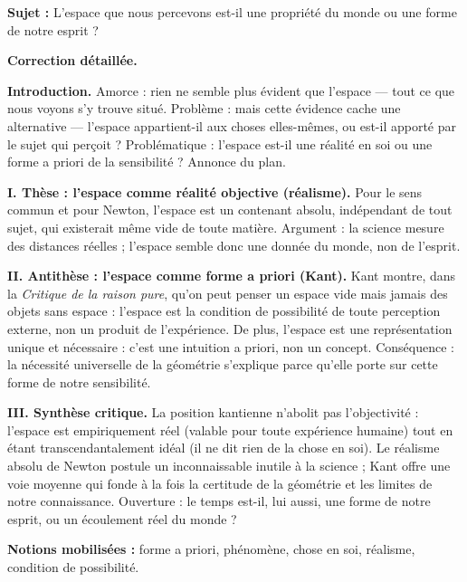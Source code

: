 \documentclass[11pt]{article}
\begin{document}
\begin{exoresolu}
\textbf{Sujet :} L'espace que nous percevons est-il une propriété du monde ou une forme de notre esprit ?

\tcblower
\textbf{Correction détaillée.}

\textbf{Introduction.} Amorce : rien ne semble plus évident que l'espace — tout ce que nous voyons s'y trouve situé. Problème : mais cette évidence cache une alternative — l'espace appartient-il aux choses elles-mêmes, ou est-il apporté par le sujet qui perçoit ? Problématique : l'espace est-il une réalité en soi ou une forme a priori de la sensibilité ? Annonce du plan.

\textbf{I. Thèse : l'espace comme réalité objective (réalisme).} Pour le sens commun et pour Newton, l'espace est un contenant absolu, indépendant de tout sujet, qui existerait même vide de toute matière. Argument : la science mesure des distances réelles ; l'espace semble donc une donnée du monde, non de l'esprit.

\textbf{II. Antithèse : l'espace comme forme a priori (Kant).} Kant montre, dans la \emph{Critique de la raison pure}, qu'on peut penser un espace vide mais jamais des objets sans espace : l'espace est la condition de possibilité de toute perception externe, non un produit de l'expérience. De plus, l'espace est une représentation unique et nécessaire : c'est une intuition a priori, non un concept. Conséquence : la nécessité universelle de la géométrie s'explique parce qu'elle porte sur cette forme de notre sensibilité.

\textbf{III. Synthèse critique.} La position kantienne n'abolit pas l'objectivité : l'espace est empiriquement réel (valable pour toute expérience humaine) tout en étant transcendantalement idéal (il ne dit rien de la chose en soi). Le réalisme absolu de Newton postule un inconnaissable inutile à la science ; Kant offre une voie moyenne qui fonde à la fois la certitude de la géométrie et les limites de notre connaissance. Ouverture : le temps est-il, lui aussi, une forme de notre esprit, ou un écoulement réel du monde ?

\textbf{Notions mobilisées :} forme a priori, phénomène, chose en soi, réalisme, condition de possibilité.
\end{exoresolu}
\end{document}
